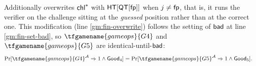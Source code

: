 Additionally overwrites $\mathsf{chl}^*$ with $\mathsf{HT}[\mathsf{QT}[\mathsf{fp}]]$ when $j \neq \mathsf{fp}$, that is, it runs the verifier on the challenge sitting at the \emph{guessed} position rather than at the correct one.
This modification (line \ref{gm:fin-overwrite}) follows the setting of $\mathsf{bad}$ at line \ref{gm:fin-set-bad}, so $\tfgamename{gameops}{G4}$ and $\tfgamename{gameops}{G5}$ are identical-until-$\mathsf{bad}$:
\begin{equation}\label{eq:g4g5}
    \Pr[\tfgamename{gameops}{G4}^\adv \Rightarrow 1 \wedge \goodev_4]
    = \Pr[\tfgamename{gameops}{G5}^\adv \Rightarrow 1 \wedge \goodev_5].
\end{equation}
